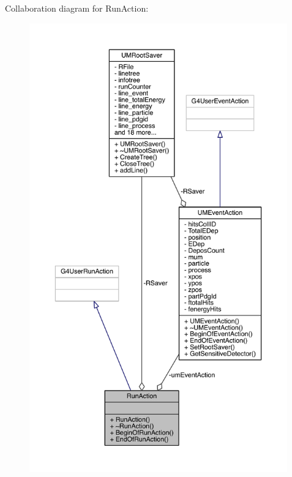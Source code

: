 Collaboration diagram for Run\+Action\+:
\nopagebreak
\begin{figure}[H]
\begin{center}
\leavevmode
\includegraphics[height=550pt]{classRunAction__coll__graph}
\end{center}
\end{figure}
